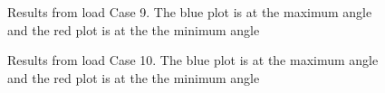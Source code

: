 \begin{figure}[H]
\hfill
{}\hfill
\caption[$\; \:$Results from load Case 9]{Results from load Case 9. The blue plot is at the maximum angle and the red plot is at the the minimum angle}
\label{fig:r9}
\end{figure}

\begin{figure}[H]
\hfill
{}\hfill
\caption[$\; \:$Results from load Case 10]{Results from load Case 10. The blue plot is at the maximum angle and the red plot is at the the minimum angle}
\label{fig:r10}
\end{figure}

